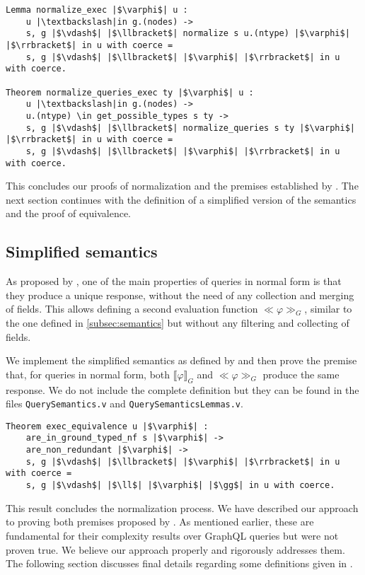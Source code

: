 \begin{verbatim}
Lemma normalize_exec |$\varphi$| u :
    u |\textbackslash|in g.(nodes) ->
    s, g |$\vdash$| |$\llbracket$| normalize s u.(ntype) |$\varphi$| |$\rrbracket$| in u with coerce =
    s, g |$\vdash$| |$\llbracket$| |$\varphi$| |$\rrbracket$| in u with coerce.

Theorem normalize_queries_exec ty |$\varphi$| u :
    u |\textbackslash|in g.(nodes) ->
    u.(ntype) \in get_possible_types s ty ->
    s, g |$\vdash$| |$\llbracket$| normalize_queries s ty |$\varphi$| |$\rrbracket$| in u with coerce =
    s, g |$\vdash$| |$\llbracket$| |$\varphi$| |$\rrbracket$| in u with coerce.

\end{verbatim}

This concludes our proofs of normalization and the premises established by \HP{}.
The next section continues with the definition of a simplified version of the semantics
and the proof of equivalence.

\subsection{Simplified semantics}

As proposed by \HP{}, one of the main properties of queries in normal form is that they produce a unique response, without the need of any collection and merging of fields. This allows defining a second evaluation function $\ll \varphi \gg_{G}$, similar to the one defined in \ref{subsec:semantics} but without any filtering and collecting of fields.

We implement the simplified semantics as defined by \HP{} and then prove the premise that, for queries in normal form, both $\llbracket \varphi \rrbracket_{G}$ and $\ll \varphi \gg_{G}$ produce the same response. We do not include the complete definition but they can be found in the files \texttt{QuerySemantics.v} and \texttt{QuerySemanticsLemmas.v}.

\begin{verbatim}
Theorem exec_equivalence u |$\varphi$| :
    are_in_ground_typed_nf s |$\varphi$| ->
    are_non_redundant |$\varphi$| ->
    s, g |$\vdash$| |$\llbracket$| |$\varphi$| |$\rrbracket$| in u with coerce =
    s, g |$\vdash$| |$\ll$| |$\varphi$| |$\gg$| in u with coerce.
\end{verbatim}

This result concludes the normalization process. We have described our approach to proving both premises proposed by \HP{}. As mentioned earlier, these are fundamental for their complexity results over GraphQL queries but were not proven true. We believe our approach properly and rigorously addresses them. The following section discusses final details regarding some definitions given in \HP{}.

